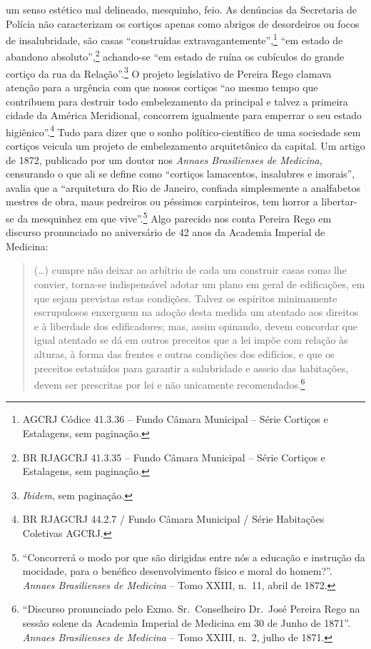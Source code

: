 um senso estético mal delineado, mesquinho, feio. As denúncias da
Secretaria de Polícia não caracterizam os cortiços apenas como abrigos
de desordeiros ou focos de insalubridade, são casas ``construídas
extravagantemente'',\footnote{AGCRJ Códice 41.3.36 -- Fundo Câmara
  Municipal -- Série Cortiços e Estalagens, sem paginação.} ``em estado
de abandono absoluto'',\footnote{BR RJAGCRJ 41.3.35 -- Fundo Câmara
  Municipal -- Série Cortiços e Estalagens, sem paginação.} achando-se
``em estado de ruína os cubículos do grande cortiço da rua da
Relação''.\footnote{\emph{Ibidem}, sem paginação.} O projeto legislativo
de Pereira Rego clamava atenção para a urgência com que nossos cortiços
``ao mesmo tempo que contribuem para destruir todo embelezamento da
principal e talvez a primeira cidade da América Meridional, concorrem
igualmente para emperrar o seu estado higiênico''.\footnote{BR RJAGCRJ
  44.2.7 / Fundo Câmara Municipal / Série Habitações Coletivas AGCRJ.}
Tudo para dizer que o sonho político-científico de uma sociedade sem
cortiços veicula um projeto de embelezamento arquitetônico da capital.
Um artigo de 1872, publicado por um doutor nos \emph{Annaes Brasilienses
de Medicina}, censurando o que ali se define como ``cortiços lamacentos,
insalubres e imorais'', avalia que a ``arquitetura do Rio de Janeiro,
confiada simplesmente a analfabetos mestres de obra, maus pedreiros ou
péssimos carpinteiros, tem horror a libertar-se da mesquinhez em que
vive''.\footnote{``Concorrerá o modo por que são dirigidas entre nós a
  educação e instrução da mocidade, para o benéfico desenvolvimento
  físico e moral do homem?''. \emph{Annaes Brasilienses de Medicina} --
  Tomo XXIII, n.~11, abril de 1872.} Algo parecido nos conta Pereira
Rego em discurso pronunciado no aniversário de 42 anos da Academia
Imperial de Medicina:

\begin{quote}
(\ldots{}) cumpre não deixar ao arbítrio de cada um construir casas como
lhe convier, torna-se indispensável adotar um plano em geral de
edificações, em que sejam previstas estas condições. Talvez os espíritos
minimamente escrupulosos enxerguem na adoção desta medida um atentado
aos direitos e à liberdade dos edificadores; mas, assim opinando, devem
concordar que igual atentado se dá em outros preceitos que a lei impõe
com relação às alturas, à forma das frentes e outras condições dos
edifícios, e que os preceitos estatuídos para garantir a salubridade e
asseio das habitações, devem ser prescritas por lei e não unicamente
recomendados.\footnote{``Discurso pronunciado pelo Exmo. Sr.~Conselheiro
  Dr.~José Pereira Rego na sessão solene da Academia Imperial de
  Medicina em 30 de Junho de 1871''. \emph{Annaes Brasilienses de
  Medicina} -- Tomo XXIII, n.~2, julho de 1871.}
\end{quote}

